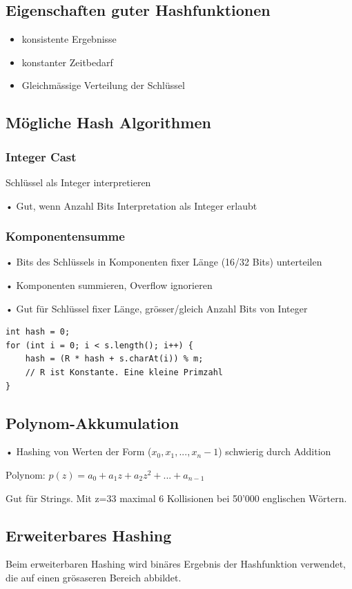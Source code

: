 \begin{multicols*}{4}
	\subsection{Eigenschaften guter Hashfunktionen}
	\begin{itemize}
		\item konsistente Ergebnisse
		\item konstanter Zeitbedarf
		\item Gleichmässige Verteilung der Schlüssel
	\end{itemize}

	\subsection{Mögliche Hash Algorithmen}
		\subsubsection{Integer Cast}
		Schlüssel als Integer interpretieren
		
		• Gut, wenn Anzahl Bits Interpretation als Integer erlaubt
	
		\subsubsection{Komponentensumme}
		• Bits des Schlüssels in Komponenten fixer Länge (16/32 Bits) unterteilen
		
		• Komponenten summieren, Overflow ignorieren
		
		• Gut für Schlüssel fixer Länge, grösser/gleich Anzahl Bits von Integer
		
		\begin{lstlisting}
int hash = 0;
for (int i = 0; i < s.length(); i++) {
	hash = (R * hash + s.charAt(i)) % m;
	// R ist Konstante. Eine kleine Primzahl
}
		\end{lstlisting}	
	
	\subsection{Polynom-Akkumulation}
	• Hashing von Werten der Form ($x_0, x_1 , ..., x_n-1$) schwierig durch Addition
	
	Polynom:
	$p(z) = a_0 + a_1z + a_2z^2 + ... + a_{n-1}$
		
	Gut für Strings. Mit z=33 maximal 6 Kollisionen bei 50'000 englischen Wörtern.

	\subsection{Erweiterbares Hashing}
	Beim erweiterbaren Hashing wird binäres Ergebnis der Hashfunktion verwendet, die auf einen grösaseren Bereich abbildet.
	

\end{multicols*}
